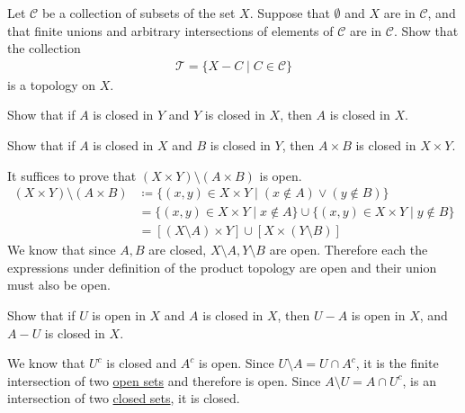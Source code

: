   \begin{exercise}[Munkres 17.1]
    Let $\mathcal{C}$ be a collection of subsets of the set $X$. Suppose that $\emptyset$ and $X$ are in $\mathcal{C}$, and that finite unions and arbitrary intersections of elements of $\mathcal{C}$ are in $\mathcal{C}$. Show that the collection
    \begin{align*}
      \mathcal{T} = \{X - C \mid C \in \mathcal{C}\}
    \end{align*}
    is a topology on $X$.
  \end{exercise}
  \begin{solution}
    
  \end{solution}

  \begin{exercise}[Munkres 17.2]
    Show that if $A$ is closed in $Y$ and $Y$ is closed in $X$, then $A$ is closed in $X$.
  \end{exercise}
  \begin{solution}
    
  \end{solution}

  \begin{exercise}[Munkres 17.3]
    Show that if $A$ is closed in $X$ and $B$ is closed in $Y$, then $A \times B$ is closed in $X \times Y$.
  \end{exercise}
  \begin{solution} 
    It suffices to prove that $(X \times Y) \setminus (A \times B)$ is open. 
    \begin{align}
      (X \times Y) \setminus (A \times B) & \coloneqq \{ (x, y) \in X \times Y \mid (x \not\in A) \lor (y \not\in B) \} \\
                                          & = \{(x, y) \in X \times Y \mid x \not\in A \} \cup \{(x, y) \in X \times Y \mid y \not\in B \} \\
                                          & = [(X \setminus A) \times Y] \cup [X \times (Y \setminus B)]
    \end{align}
    We know that since $A, B$ are closed, $X \setminus A, Y \setminus B$ are open. Therefore each the expressions under definition of the product topology are open and their union must also be open. 
  \end{solution}

  \begin{exercise}[Munkres 17.4]
    Show that if $U$ is open in $X$ and $A$ is closed in $X$, then $U - A$ is open in $X$, and $A - U$ is closed in $X$.
  \end{exercise}
  \begin{solution}
    We know that $U^c$ is closed and $A^c$ is open. Since $U \setminus A = U \cap A^c$, it is the finite intersection of two \hyperref[def:open-set]{open sets} and therefore is open. Since $A \setminus U = A \cap U^c$, is an intersection of two \hyperref[def:closed]{closed sets}, it is closed. 
  \end{solution}

